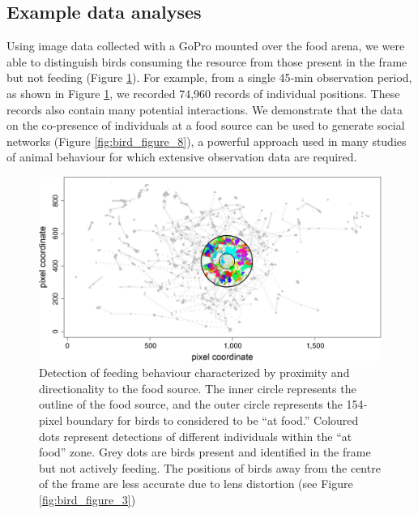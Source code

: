\documentclass[11pt,a4paper,twoside]{book}
\begin{document}
\begin{doublespace}
\subsection{Example data analyses}
Using image data collected with a GoPro mounted over the food arena, we were able to distinguish birds consuming the resource from those present in the frame but not feeding (Figure \ref{fig:bird_figure_7}). For example, from a single 45‐min observation period, as shown in Figure \ref{fig:bird_figure_7}, we recorded 74,960 records of individual positions. These records also contain many potential interactions. We demonstrate that the data on the co‐presence of individuals at a food source can be used to generate social networks (Figure \ref{fig:bird_figure_8}), a powerful approach used in many studies of animal behaviour for which extensive observation data are required.

\begin{figure}[!htb]
    \centering
    \includegraphics{Graving_IMPRS_Thesis/figures/bird_figure_7.jpg}
    \caption{Detection of feeding behaviour characterized by proximity and directionality to the food source. The inner circle represents the outline of the food source, and the outer circle represents the 154‐pixel boundary for birds to considered to be “at food.” Coloured dots represent detections of different individuals within the “at food” zone. Grey dots are birds present and identified in the frame but not actively feeding. The positions of birds away from the centre of the frame are less accurate due to lens distortion (see Figure \ref{fig:bird_figure_3})
}
    \label{fig:bird_figure_7}
\end{figure}


\end{doublespace}
\end{document}
